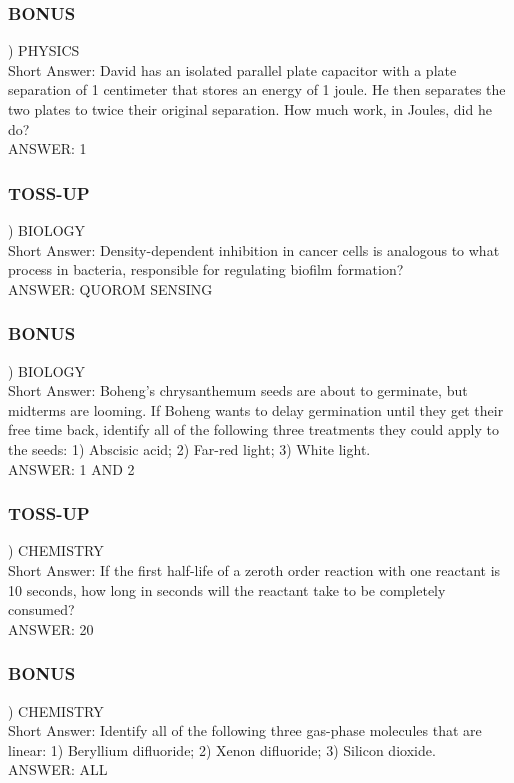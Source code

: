 \documentclass{article}
\begin{document}
\subsubsection*{BONUS}
) PHYSICS \\
Short Answer: David has an isolated parallel plate capacitor with a plate separation of 1 centimeter that stores an energy of 1 joule. He then separates the two plates to twice their original separation. How much work, in Joules, did he do? \\
ANSWER: 1

\newpage

\subsubsection*{TOSS-UP}
) BIOLOGY \\
Short Answer: Density-dependent inhibition in cancer cells is analogous to what process in bacteria, responsible for regulating biofilm formation? \\
ANSWER: QUOROM SENSING

\subsubsection*{BONUS}
) BIOLOGY \\
Short Answer: Boheng's chrysanthemum seeds are about to germinate, but midterms are looming. If Boheng wants to delay germination until they get their free time back, identify all of the following three treatments they could apply to the seeds: 1) Abscisic acid; 2) Far-red light; 3) White light. \\
ANSWER: 1 AND 2

\subsubsection*{TOSS-UP}
) CHEMISTRY \\
Short Answer: If the first half-life of a zeroth order reaction with one reactant is 10 seconds, how long in seconds will the reactant take to be completely consumed? \\
ANSWER: 20

\subsubsection*{BONUS}
) CHEMISTRY \\
Short Answer: Identify all of the following three gas-phase molecules that are linear: 1) Beryllium difluoride; 2) Xenon difluoride; 3) Silicon dioxide. \\
ANSWER: ALL
\end{document}

